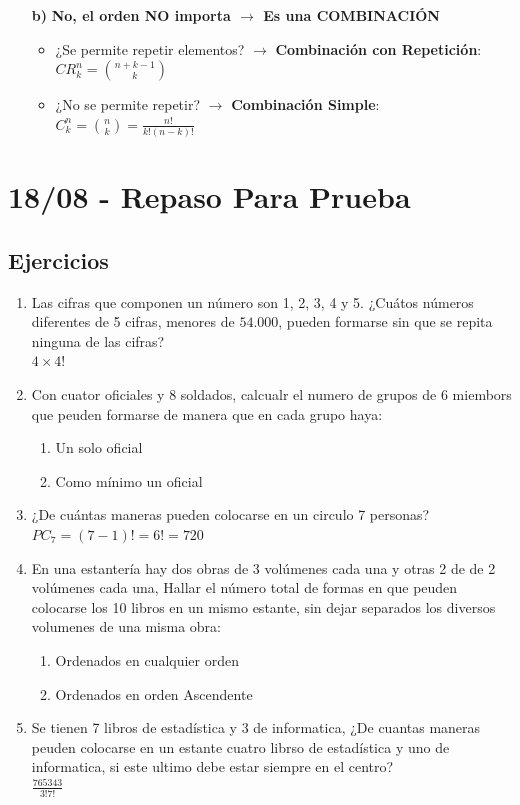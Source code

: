 \documentclass[12pt, letterpaper]{article}
\begin{document}
\begin{enumerate}[label=\bfseries, wide]
\begin{itemize}
		      \item[\bfseries b)] \textbf{No, el orden NO importa $\rightarrow$ Es una COMBINACIÓN}
		            \begin{itemize}
			            \item ¿Se permite repetir elementos? $\rightarrow$ \textbf{Combinación con Repetición}: $CR_k^n = \binom{n+k-1}{k}$
			            \item ¿No se permite repetir? $\rightarrow$ \textbf{Combinación Simple}: $C_k^n = \binom{n}{k} = \frac{n!}{k!(n-k)!}$
		            \end{itemize}
	      \end{itemize}
\end{enumerate}

\newpage


\section{18/08 - Repaso Para Prueba}

\subsection{Ejercicios}
\begin{enumerate}
	\item Las cifras que componen un número son 1, 2, 3, 4 y 5. ¿Cuátos números diferentes de 5 cifras, menores de $54.000$, pueden formarse sin que se repita ninguna de las cifras? \\
        $4 \times 4!$
	\item Con cuator oficiales y 8 soldados, calcualr el numero de grupos de 6 miembors que peuden formarse de manera que en cada grupo haya:
	      \begin{enumerate}
		      \item Un solo oficial
		      \item Como mínimo un oficial
	      \end{enumerate}
	\item ¿De cuántas maneras pueden colocarse en un circulo 7 personas? \\ 
        $PC_7 = (7-1)! = 6! = 720$
	\item En una estantería hay dos obras de 3 volúmenes cada una y otras 2 de de 2 volúmenes cada una, Hallar el número total de formas en que peuden colocarse los 10 libros en un mismo estante, sin dejar separados los diversos volumenes de una misma obra:
	      \begin{enumerate}
		      \item Ordenados en cualquier orden
		      \item Ordenados en orden Ascendente
	      \end{enumerate}
	\item Se tienen 7 libros de estadística y 3 de informatica, ¿De cuantas maneras peuden colocarse en un estante cuatro librso de estadística y uno de informatica, si este ultimo debe estar siempre en el centro? \\
	      $\frac{7 6 5 3 4 3 }{3! 7!}$
\end{enumerate}
\end{document}
